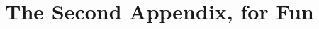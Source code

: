\documentclass[a4paper, nobind]{templates/ociamthesis}
\newcommand*{\bibtitle}{References}
\begin{document}
\hypertarget{the-second-appendix-for-fun}{%
\chapter{The Second Appendix, for Fun}\label{the-second-appendix-for-fun}}




\setlength{\baselineskip}{0pt} %

{\renewcommand*\MakeUppercase[1]{#1}%
\printbibliography[heading=bibintoc,title={\bibtitle}]}
\end{document}
